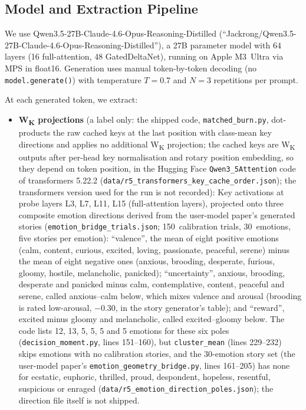 \documentclass[11pt,a4paper]{article}
\begin{document}
\subsection{Model and Extraction Pipeline}

We use Qwen3.5-27B-Claude-4.6-Opus-Reasoning-Distilled
(``Jackrong/Qwen3.5-27B-Claude-4.6-Opus-Reasoning-Distilled''), a 27B
parameter model with 64 layers (16 full-attention, 48 GatedDeltaNet),
running on Apple M3~Ultra via MPS in float16. Generation uses manual
token-by-token decoding (no \texttt{model.generate()}) with temperature
$T{=}0.7$ and $N{=}3$ repetitions per prompt.

At each generated token, we extract:
\begin{itemize}[nosep]
    \item \textbf{W\textsubscript{K} projections} (a label only: the shipped code, \texttt{matched\_burn.py}, dot-products the raw cached keys at the last position with class-mean key directions and applies no additional W\textsubscript{K} projection; the cached keys are W\textsubscript{K} outputs after per-head key normalisation and rotary position embedding, so they depend on token position, in the Hugging Face \texttt{Qwen3\_5Attention} code of transformers 5.22.2 (\texttt{data/\allowbreak r5\_\allowbreak transformers\_\allowbreak key\_\allowbreak cache\_\allowbreak order.json}); the transformers version used for the run is not recorded): Key activations at
          probe layers L3, L7, L11, L15 (full-attention layers), projected
          onto three composite emotion directions derived from the user-model paper's generated stories
          (\texttt{emotion\_\allowbreak bridge\_\allowbreak trials.json}; 150~calibration trials, 30~emotions, five stories per emotion): ``valence'', the mean of eight positive emotions (calm, content, curious, excited, loving, passionate, peaceful, serene) minus the mean of eight negative ones (anxious, brooding, desperate, furious, gloomy, hostile, melancholic, panicked); ``uncertainty'', anxious, brooding, desperate and panicked minus calm, contemplative, content, peaceful and serene, called anxious--calm below, which mixes valence and arousal (brooding is rated low-arousal, $-0.30$, in the story generator's table); and ``reward'', excited minus gloomy and melancholic, called excited--gloomy below. The code lists 12, 13, 5, 5, 5 and 5 emotions for these six poles (\texttt{decision\_moment.py}, lines 151--160), but \texttt{cluster\_mean} (lines 229--232) skips emotions with no calibration stories, and the 30-emotion story set (the user-model paper's \texttt{emotion\_\allowbreak geometry\_\allowbreak bridge.py}, lines 161--205) has none for ecstatic, euphoric, thrilled, proud, despondent, hopeless, resentful, suspicious or enraged (\texttt{data/\allowbreak r5\_\allowbreak emotion\_\allowbreak direction\_\allowbreak poles.json}); the direction file itself is not shipped.

\end{itemize}
\end{document}
